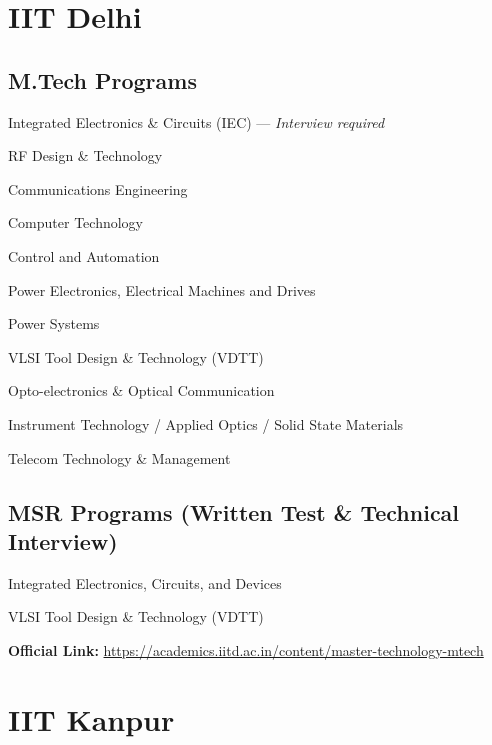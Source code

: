 \section{IIT Delhi}
\label{sec:iitd}

\subsection*{M.Tech Programs}

\begin{pfChecklist}
  \item Integrated Electronics \& Circuits (IEC) --- \textit{Interview required}
  \item RF Design \& Technology
  \item Communications Engineering
  \item Computer Technology
  \item Control and Automation
  \item Power Electronics, Electrical Machines and Drives
  \item Power Systems
  \item VLSI Tool Design \& Technology (VDTT)
  \item Opto-electronics \& Optical Communication
  \item Instrument Technology / Applied Optics / Solid State Materials
  \item Telecom Technology \& Management
\end{pfChecklist}

\subsection*{MSR Programs (Written Test \& Technical Interview)}
\begin{pfChecklist}
  \item Integrated Electronics, Circuits, and Devices
  \item VLSI Tool Design \& Technology (VDTT)
\end{pfChecklist}

\noindent\textbf{Official Link:}
\url{https://academics.iitd.ac.in/content/master-technology-mtech}

\section{IIT Kanpur}
\label{sec:iitk}

